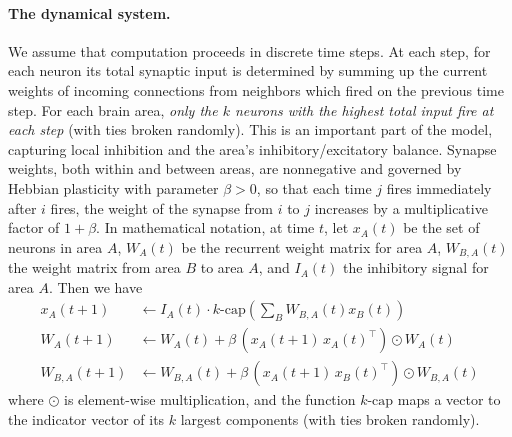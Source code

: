 \documentclass[12pt,nosubfloats]{alt2024} %
\newcommand{\R}{\mathbb{R}}
\newcommand{\1}{\mathbbm{1}}
\begin{document}
\paragraph{The dynamical system.} We assume that computation proceeds in discrete time steps.  At each step, for each neuron its total synaptic input is determined by summing up the current weights of incoming connections from neighbors which fired on the previous time step. For each brain area, {\em only the $k$ neurons with the highest total input fire at each step} (with ties broken randomly).  This is an important part of the model, capturing local inhibition and the area's inhibitory/excitatory balance.  
Synapse weights, both within and between areas, are nonnegative and governed by Hebbian plasticity with parameter $\beta > 0$, so that each time $j$ fires immediately after $i$ fires, the weight of the synapse from $i$ to $j$ increases by a multiplicative factor of $1 + \beta$. In mathematical notation, at time $t$, let $x_A(t)$ be the set of neurons in area $A$, $W_A(t)$ be the recurrent weight matrix for area $A$, $W_{B, A}(t)$ the weight matrix from area $B$ to area $A$, and $I_A(t)$ the inhibitory signal for area $A$. Then we have
\begin{align*}
        x_A(t+1) &\gets I_A(t) \cdot k\text{-cap}\left(\sum_{B} W_{B, A}(t) x_B(t) \right)\\
        W_A(t+1) &\gets W_A(t) + \beta \, (x_A(t+1) \, x_A(t)^\top) \odot W_A(t)\\
        W_{B, A}(t+1) &\gets W_{B,A}(t) + \beta \, (x_A(t+1) \, x_B(t)^\top) \odot W_{B, A}(t) 
\end{align*}
where $\odot$ is element-wise multiplication, and the function $k\text{-cap}$ maps a vector to the indicator vector of its $k$ largest components (with ties broken randomly). 
\end{document}
